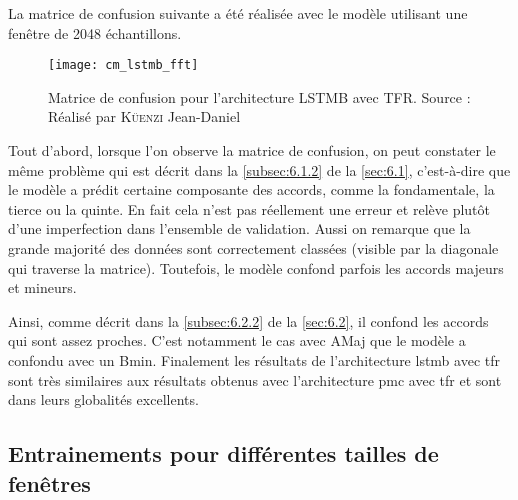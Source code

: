 La matrice de confusion suivante a été réalisée avec le modèle utilisant une fenêtre de 2048 échantillons.

\begin{figure}[H]
	\centering
	\texttt{[image: cm\_lstmb\_fft]}
	\caption[Matrice de confusion pour l'architecture LSTMB avec TFR]{Matrice de confusion pour l'architecture LSTMB avec TFR. Source : Réalisé par \textsc{Küenzi} Jean-Daniel}
	\label{fig:cm_lstmb_fft}
\end{figure}

Tout d'abord, lorsque l'on observe la matrice de confusion, on peut constater le même problème qui est décrit dans la \autoref{subsec:6.1.2} de la \autoref{sec:6.1}, c'est-à-dire que le modèle a prédit certaine composante des accords, comme la fondamentale, la tierce ou la quinte. En fait cela n'est pas réellement une erreur et relève plutôt d'une imperfection dans l'ensemble de validation. Aussi on remarque que la grande majorité des données sont correctement classées (visible par la diagonale qui traverse la matrice). Toutefois, le modèle confond parfois les accords majeurs et mineurs. 

Ainsi, comme décrit dans la \autoref{subsec:6.2.2} de la \autoref{sec:6.2}, il confond les accords qui sont assez proches. C'est notamment le cas avec A\sh Maj que le modèle a confondu avec un Bmin. Finalement les résultats de l'architecture \gls{lstmb} avec \gls{tfr} sont très similaires aux résultats obtenus avec l'architecture \gls{pmc} avec \gls{tfr} et sont dans leurs globalités excellents.

\subsection{Entrainements pour différentes tailles de fenêtres}

